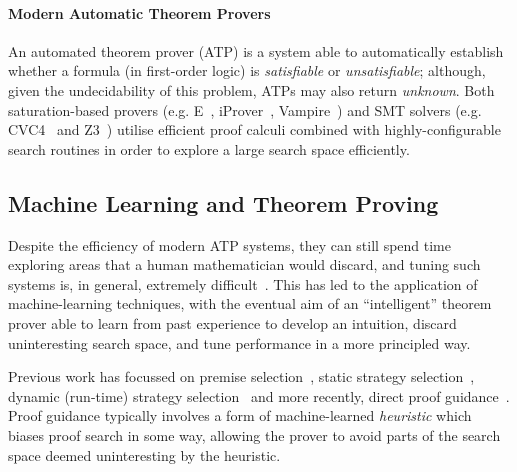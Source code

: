 \documentclass{llncs}
\begin{document}
\paragraph{Modern Automatic Theorem Provers}
An automated theorem prover (ATP) is a system able to automatically establish whether a formula (in first-order logic) is \emph{satisfiable} or \emph{unsatisfiable}; although, given the undecidability of this problem, ATPs may also return \emph{unknown}. Both saturation-based provers (e.g. E~\cite{E}, iProver~\cite{iProver}, Vampire~\cite{Vampire}) and SMT solvers (e.g. CVC4~\cite{CVC4} and Z3~\cite{Z3}) utilise efficient proof calculi combined with highly-configurable search routines in order to explore a large search space efficiently.

\subsection{Machine Learning and Theorem Proving}
Despite the efficiency of modern ATP systems, they can still spend time exploring areas that a human mathematician would discard, and tuning such systems is, in general, extremely difficult~\cite{portfolio}.
This has led to the application of machine-learning techniques, with the eventual aim of an ``intelligent'' theorem prover able to learn from past experience to develop an intuition, discard uninteresting search space, and tune performance in a more principled way.

Previous work has focussed on premise selection~\cite{DeepMath,MaSh,MaLARea,formula-graph}, static strategy selection~\cite{Bridge,MaLeS,E-MaLeS}, dynamic (run-time) strategy selection~\cite{dynamic-strategy-priority} and more recently, direct proof guidance~\cite{MaLeCoP,FEMaLeCoP,rlCoP,ENIGMA,DNGPS}.
Proof guidance typically involves a form of machine-learned \emph{heuristic} which biases proof search in some way, allowing the prover to avoid parts of the search space deemed uninteresting by the heuristic.
\end{document}
